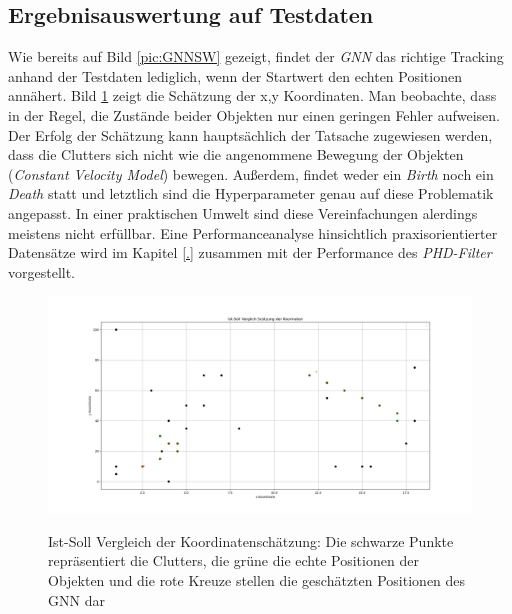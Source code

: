 \documentclass[10pt,a4paper]{article}
\begin{document}
\subsection{Ergebnisauswertung auf Testdaten}\label{sub:GNNEinflussParam}
Wie bereits auf Bild \ref{pic:GNNSW} gezeigt, findet der \textit{GNN} das richtige Tracking anhand der Testdaten lediglich, wenn der Startwert den echten Positionen annähert. Bild \ref{pic:GNNXY} zeigt die Schätzung der x,y Koordinaten. Man beobachte, dass in der Regel, die Zustände beider Objekten nur einen geringen Fehler aufweisen. Der Erfolg der Schätzung kann hauptsächlich der Tatsache zugewiesen werden, dass die Clutters sich nicht wie die angenommene Bewegung der Objekten (\textit{Constant Velocity Model}) bewegen. Außerdem, findet weder ein \textit{Birth} noch ein \textit{Death} statt und letztlich sind die Hyperparameter genau auf diese Problematik angepasst. In einer praktischen Umwelt sind diese Vereinfachungen alerdings meistens nicht erfüllbar. Eine Performanceanalyse hinsichtlich praxisorientierter Datensätze wird im Kapitel \ref{.} zusammen mit der Performance des \textit{PHD-Filter} vorgestellt.  \\
\begin{figure}[h!]
\includegraphics[width=12 cm]{./Pictures_report/GNNTestdatenXY}\label{ConvexConcave}
\caption{Ist-Soll Vergleich der Koordinatenschätzung: Die schwarze Punkte repräsentiert die Clutters, die grüne die echte Positionen der Objekten und die rote Kreuze stellen die geschätzten Positionen des GNN dar}
\label{pic:GNNXY}
\end{figure}
\end{document}
